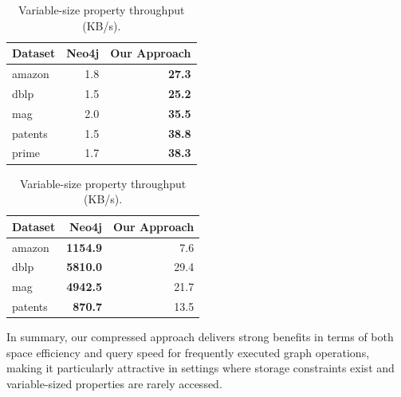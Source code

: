 \begin{table}[htbp]
  \centering
  \begin{minipage}{0.48\textwidth}
    \centering
    \caption{Fixed-size property throughput (MB/s).}
    \label{tab:gdb_fixed_props_time}
    \begin{tabular}{lrr}
      \toprule
      Dataset & Neo4j & Our Approach \\
      \midrule
      amazon   & 1.8  & \textbf{27.3} \\
      dblp     & 1.5  & \textbf{25.2} \\
      mag      & 2.0  & \textbf{35.5} \\
      patents  & 1.5  & \textbf{38.8} \\
      prime    & 1.7  & \textbf{38.3} \\
      \bottomrule
    \end{tabular}
  \end{minipage}
  \hfill
  \begin{minipage}{0.48\textwidth}
    \centering
    \caption{Variable-size property throughput (KB/s).}
    \label{tab:gdb_var_props_time}
    \begin{tabular}{lrr}
      \toprule
      Dataset & Neo4j & Our Approach \\
      \midrule
      amazon   & \textbf{1154.9}   & 7.6 \\
      dblp     & \textbf{5810.0}  & 29.4 \\
      mag      & \textbf{4942.5}  & 21.7 \\
      patents  & \textbf{870.7}  & 13.5 \\
      \bottomrule
    \end{tabular}
  \end{minipage}
\end{table}
\FloatBarrier

In summary, our compressed approach delivers strong benefits in terms of both space efficiency and query speed for frequently executed graph operations, making it particularly attractive in settings where storage constraints exist and variable-sized properties are rarely accessed.
